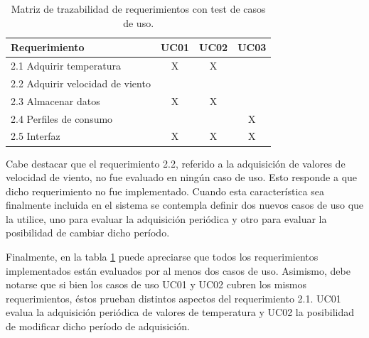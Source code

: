 \begin{table}[ht]
\centering
\caption{Matriz de trazabilidad de requerimientos con test de casos de uso.}
\label{tab:trazabilidad_test}
\begin{tabular}{lccc}
\toprule
\textbf{Requerimiento}					   & \textbf{UC01} 	  & \textbf{UC02}  & \textbf{UC03}  \\ \midrule
2.1 Adquirir temperatura                   & X                & X              &    		 	\\ %
2.2 Adquirir velocidad de viento           &                  &                &   		  		\\ %
2.3 Almacenar datos                        & X                & X              &      			\\ %
2.4 Perfiles de consumo                    &                  &                & X    			\\ %
2.5 Interfaz                               & X                & X              & X    			\\ 
\bottomrule
\end{tabular}
\end{table}

Cabe destacar que el requerimiento 2.2, referido a la adquisición de valores de velocidad de viento, no fue evaluado en ningún caso de uso.  Esto responde a que dicho requerimiento no fue implementado.  Cuando esta característica sea finalmente incluida en el sistema se contempla definir dos nuevos casos de uso que la utilice, uno para evaluar la adquisición periódica y otro para evaluar la posibilidad de cambiar dicho período.

Finalmente, en la tabla \ref{tab:trazabilidad_test} puede apreciarse que todos los requerimientos implementados están evaluados por al menos dos casos de uso.  Asimismo, debe notarse que si bien los casos de uso UC01 y UC02 cubren los mismos requerimientos, éstos prueban distintos aspectos del requerimiento 2.1.  UC01 evalua la adquisición periódica de valores de temperatura y UC02 la posibilidad de modificar dicho período de adquisición.